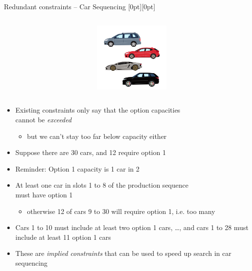 \documentclass{cons-beamer}
\begin{document}
\begin{frame}{Redundant constraints -- Car Sequencing}
  \raisebox{-\height}[0pt][0pt]{%
    \begin{columns}
      \begin{column}{0.7\textwidth}
          
      \end{column}
      \begin{column}{0.3\textwidth}
        \includegraphics[height=35mm]{images/car_seq.png}%
      \end{column}
    \end{columns}
  }

  \begin{itemize}
      \item Existing constraints only say that the option capacities \\ cannot be \emph{exceeded}
            \begin{itemize}
                \item but we can’t stay too far below capacity either
            \end{itemize}
            \vfill

      \item Suppose there are 30 cars, and 12 require option 1 
      \vfill
      
      \item Reminder: Option 1 capacity is 1 car in 2
      \vfill

      \item At least one car in slots 1 to 8 of the production sequence \\ must have option 1
            \begin{itemize}
              \item otherwise 12 of cars 9 to 30 will require option 1, i.e. too many
            \end{itemize}
      \vfill

      \item Cars 1 to 10 must include at least two option 1 cars, \ldots, and cars 1 to 28 must include at least 11 option 1 cars
      \vfill

      \item These are \emph{implied constraints} that can be used to speed up search in car sequencing
  \end{itemize}
\end{frame}
\end{document}
